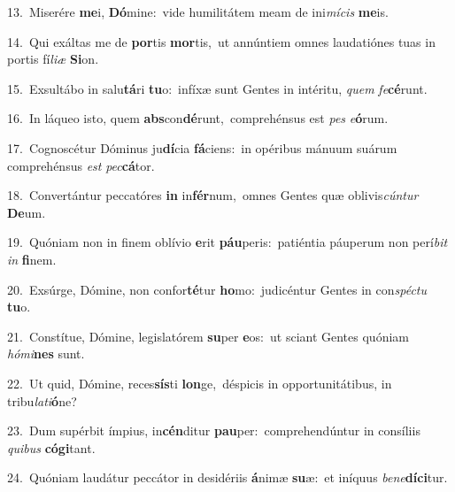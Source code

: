 {\numbfont\textcolor{\numbcolor}{13.}}~Miserére \textbf{me}\-i, \textbf{Dó}\-mine:~\star vide humilitátem meam de ini\-\textit{mí}\-\textit{cis} \textbf{me}\-is.\par
{\numbfont\textcolor{\numbcolor}{14.}}~Qui exáltas me de \textbf{por}\-tis \textbf{mor}\-tis,~\star ut annúntiem omnes laudatiónes tuas in portis fí\-\textit{li}\-\textit{æ} \textbf{Si}\-on.\par
{\numbfont\textcolor{\numbcolor}{15.}}~Exsultábo in salu\-\textbf{tá}\-ri \textbf{tu}\-o:~\star infíxæ sunt Gentes in intéritu, \textit{quem} \textit{fe}\-\textbf{cé}runt.\par
{\numbfont\textcolor{\numbcolor}{16.}}~In láqueo isto, quem \textbf{abs}\-con\-\textbf{dé}\-runt,~\star comprehénsus est \textit{pes} \textit{e}\-\textbf{ó}rum.\par
{\numbfont\textcolor{\numbcolor}{17.}}~Cognoscétur Dóminus ju\-\textbf{dí}\-cia \textbf{fá}\-ciens:~\star in opéribus mánuum suárum comprehénsus \textit{est} \textit{pec}\-\textbf{cá}tor.\par
{\numbfont\textcolor{\numbcolor}{18.}}~Convertántur peccatóres \textbf{in} in\-\textbf{fér}\-num,~\star omnes Gentes quæ oblivis\-\textit{cún}\-\textit{tur} \textbf{De}\-um.\par
{\numbfont\textcolor{\numbcolor}{19.}}~Quóniam non in finem oblívio \textbf{e}\-rit \textbf{páu}\-peris:~\star patiéntia páuperum non perí\textit{bit} \textit{in} \textbf{fi}\-nem.\par
{\numbfont\textcolor{\numbcolor}{20.}}~Exsúrge, Dómine, non confor\-\textbf{té}\-tur \textbf{ho}\-mo:~\star judicéntur Gentes in con\-\textit{spéc}\-\textit{tu} \textbf{tu}\-o.\par
{\numbfont\textcolor{\numbcolor}{21.}}~Constítue, Dómine, legislatórem \textbf{su}\-per \textbf{e}\-os:~\star ut sciant Gentes quóniam \textit{hó}\-\textit{mi}\textbf{nes} sunt.\par
{\numbfont\textcolor{\numbcolor}{22.}}~Ut quid, Dómine, reces\-\textbf{sís}\-ti \textbf{lon}\-ge,~\star déspicis in opportunitátibus, in tribu\-\textit{la}\-\textit{ti}\textbf{ó}ne?\par
{\numbfont\textcolor{\numbcolor}{23.}}~Dum supérbit ímpius, in\-\textbf{cén}\-ditur \textbf{pau}\-per:~\star comprehendúntur in consíliis \textit{qui}\-\textit{bus} \textbf{có}\-\textbf{gi}tant.\par
{\numbfont\textcolor{\numbcolor}{24.}}~Quóniam laudátur peccátor in desidériis \textbf{á}\-nimæ \textbf{su}\-æ:~\star et iníquus \textit{be}\-\textit{ne}\textbf{dí}\textbf{ci}tur.\par
